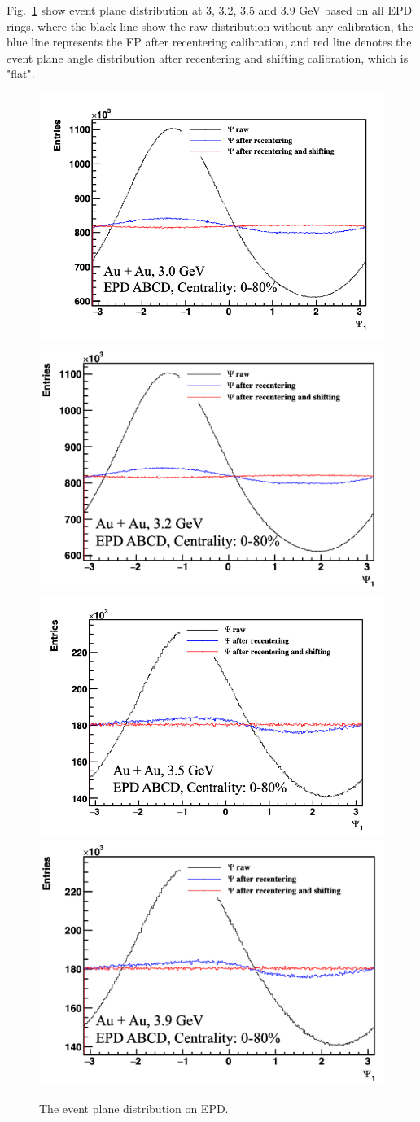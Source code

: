 Fig.~\ref{fig:EP_distribution} show event plane distribution at 3, 3.2, 3.5 and 3.9 GeV based on all EPD rings,
where the black line show the raw distribution without any calibration, the blue line represents the EP after recentering calibration, 
and red line denotes the event plane angle distribution after recentering and shifting calibration, which is "flat".
\begin{figure}[hbt!]
\centering
\includegraphics[width=0.45\linewidth]{figures/chapter02/EP_3GeV.png}
\includegraphics[width=0.45\linewidth]{figures/chapter02/EP_3p2GeV.png}
\includegraphics[width=0.45\linewidth]{figures/chapter02/EP_3p5GeV.png}
\includegraphics[width=0.45\linewidth]{figures/chapter02/EP_3p9GeV.png}
\caption{The event plane distribution on EPD.}
\label{fig:EP_distribution}
\end{figure}

